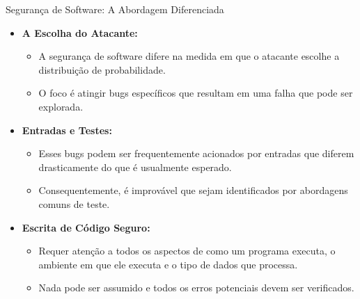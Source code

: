 \begin{frame}{Segurança de Software: A Abordagem Diferenciada}
    \begin{itemize}
        \item \textbf{A Escolha do Atacante:}
              \begin{itemize}
                  \item A segurança de software difere na medida em que o atacante escolhe a distribuição de probabilidade.
                  \item O foco é atingir bugs específicos que resultam em uma falha que pode ser explorada.
              \end{itemize}

        \item \textbf{Entradas e Testes:}
              \begin{itemize}
                  \item Esses bugs podem ser frequentemente acionados por entradas que diferem drasticamente do que é usualmente esperado.
                  \item Consequentemente, é improvável que sejam identificados por abordagens comuns de teste.
              \end{itemize}

        \item \textbf{Escrita de Código Seguro:}
              \begin{itemize}
                  \item Requer atenção a todos os aspectos de como um programa executa, o ambiente em que ele executa e o tipo de dados que processa.
                  \item Nada pode ser assumido e todos os erros potenciais devem ser verificados.
              \end{itemize}
    \end{itemize}
\end{frame}

